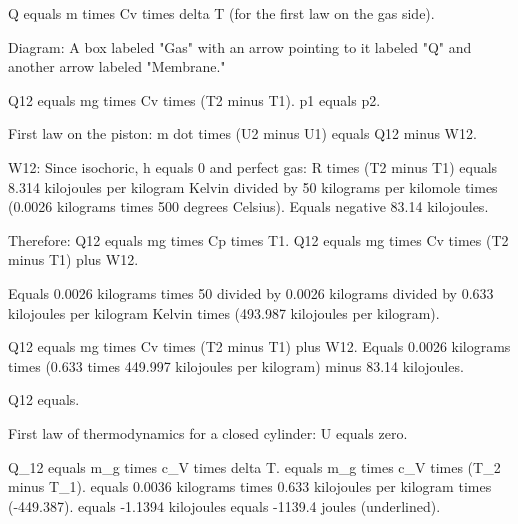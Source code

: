 Q equals m times Cv times delta T (for the first law on the gas side).  

Diagram: A box labeled "Gas" with an arrow pointing to it labeled "Q" and another arrow labeled "Membrane."  

Q12 equals mg times Cv times (T2 minus T1).  
p1 equals p2.  

First law on the piston:  
m dot times (U2 minus U1) equals Q12 minus W12.  

W12: Since isochoric, h equals 0 and perfect gas:  
R times (T2 minus T1) equals 8.314 kilojoules per kilogram Kelvin divided by 50 kilograms per kilomole times (0.0026 kilograms times 500 degrees Celsius).  
Equals negative 83.14 kilojoules.  

Therefore:  
Q12 equals mg times Cp times T1.  
Q12 equals mg times Cv times (T2 minus T1) plus W12.  

Equals 0.0026 kilograms times 50 divided by 0.0026 kilograms divided by 0.633 kilojoules per kilogram Kelvin times (493.987 kilojoules per kilogram).  

Q12 equals mg times Cv times (T2 minus T1) plus W12.  
Equals 0.0026 kilograms times (0.633 times 449.997 kilojoules per kilogram) minus 83.14 kilojoules.  

Q12 equals.

First law of thermodynamics for a closed cylinder:  
U equals zero.  

Q_12 equals m_g times c_V times delta T.  
equals m_g times c_V times (T_2 minus T_1).  
equals 0.0036 kilograms times 0.633 kilojoules per kilogram times (-449.387).  
equals -1.1394 kilojoules equals -1139.4 joules (underlined).